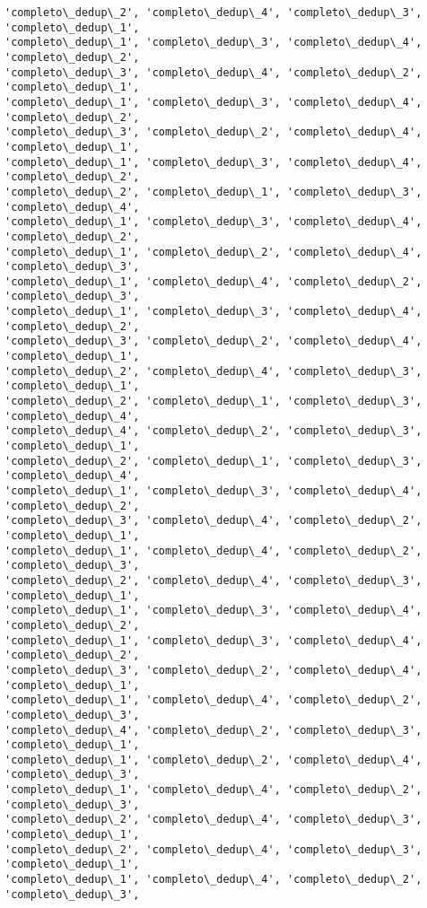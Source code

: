 \documentclass[11pt]{article}
\begin{document}
\begin{Verbatim}[commandchars=\\\{\}]
'completo\_dedup\_2', 'completo\_dedup\_4', 'completo\_dedup\_3', 'completo\_dedup\_1',
'completo\_dedup\_1', 'completo\_dedup\_3', 'completo\_dedup\_4', 'completo\_dedup\_2',
'completo\_dedup\_3', 'completo\_dedup\_4', 'completo\_dedup\_2', 'completo\_dedup\_1',
'completo\_dedup\_1', 'completo\_dedup\_3', 'completo\_dedup\_4', 'completo\_dedup\_2',
'completo\_dedup\_3', 'completo\_dedup\_2', 'completo\_dedup\_4', 'completo\_dedup\_1',
'completo\_dedup\_1', 'completo\_dedup\_3', 'completo\_dedup\_4', 'completo\_dedup\_2',
'completo\_dedup\_2', 'completo\_dedup\_1', 'completo\_dedup\_3', 'completo\_dedup\_4',
'completo\_dedup\_1', 'completo\_dedup\_3', 'completo\_dedup\_4', 'completo\_dedup\_2',
'completo\_dedup\_1', 'completo\_dedup\_2', 'completo\_dedup\_4', 'completo\_dedup\_3',
'completo\_dedup\_1', 'completo\_dedup\_4', 'completo\_dedup\_2', 'completo\_dedup\_3',
'completo\_dedup\_1', 'completo\_dedup\_3', 'completo\_dedup\_4', 'completo\_dedup\_2',
'completo\_dedup\_3', 'completo\_dedup\_2', 'completo\_dedup\_4', 'completo\_dedup\_1',
'completo\_dedup\_2', 'completo\_dedup\_4', 'completo\_dedup\_3', 'completo\_dedup\_1',
'completo\_dedup\_2', 'completo\_dedup\_1', 'completo\_dedup\_3', 'completo\_dedup\_4',
'completo\_dedup\_4', 'completo\_dedup\_2', 'completo\_dedup\_3', 'completo\_dedup\_1',
'completo\_dedup\_2', 'completo\_dedup\_1', 'completo\_dedup\_3', 'completo\_dedup\_4',
'completo\_dedup\_1', 'completo\_dedup\_3', 'completo\_dedup\_4', 'completo\_dedup\_2',
'completo\_dedup\_3', 'completo\_dedup\_4', 'completo\_dedup\_2', 'completo\_dedup\_1',
'completo\_dedup\_1', 'completo\_dedup\_4', 'completo\_dedup\_2', 'completo\_dedup\_3',
'completo\_dedup\_2', 'completo\_dedup\_4', 'completo\_dedup\_3', 'completo\_dedup\_1',
'completo\_dedup\_1', 'completo\_dedup\_3', 'completo\_dedup\_4', 'completo\_dedup\_2',
'completo\_dedup\_1', 'completo\_dedup\_3', 'completo\_dedup\_4', 'completo\_dedup\_2',
'completo\_dedup\_3', 'completo\_dedup\_2', 'completo\_dedup\_4', 'completo\_dedup\_1',
'completo\_dedup\_1', 'completo\_dedup\_4', 'completo\_dedup\_2', 'completo\_dedup\_3',
'completo\_dedup\_4', 'completo\_dedup\_2', 'completo\_dedup\_3', 'completo\_dedup\_1',
'completo\_dedup\_1', 'completo\_dedup\_2', 'completo\_dedup\_4', 'completo\_dedup\_3',
'completo\_dedup\_1', 'completo\_dedup\_4', 'completo\_dedup\_2', 'completo\_dedup\_3',
'completo\_dedup\_2', 'completo\_dedup\_4', 'completo\_dedup\_3', 'completo\_dedup\_1',
'completo\_dedup\_2', 'completo\_dedup\_4', 'completo\_dedup\_3', 'completo\_dedup\_1',
'completo\_dedup\_1', 'completo\_dedup\_4', 'completo\_dedup\_2', 'completo\_dedup\_3',

\end{Verbatim}
\end{document}
